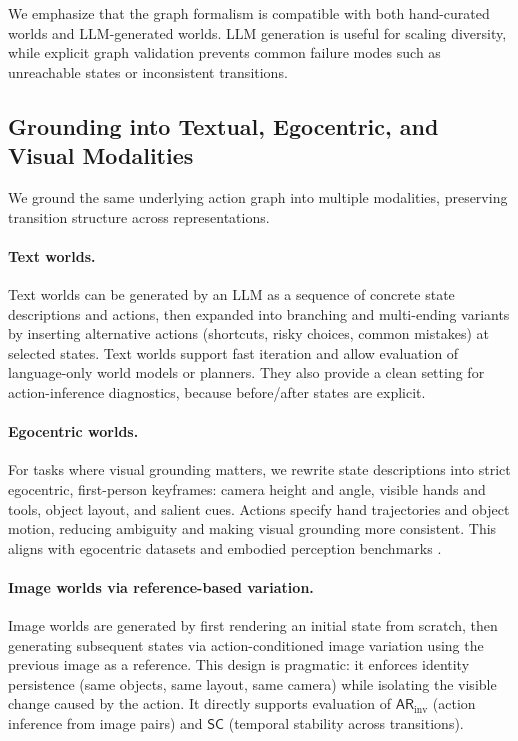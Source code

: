 \documentclass{article}
\theoremstyle{plain}
\theoremstyle{definition}
\theoremstyle{remark}
\begin{document}
We emphasize that the graph formalism is compatible with both hand-curated worlds and LLM-generated worlds. LLM generation is useful for scaling diversity, while explicit graph validation prevents common failure modes such as unreachable states or inconsistent transitions.

\subsection{Grounding into Textual, Egocentric, and Visual Modalities}
We ground the same underlying action graph into multiple modalities, preserving transition structure across representations.

\paragraph{Text worlds.}
Text worlds can be generated by an LLM as a sequence of concrete state descriptions and actions, then expanded into branching and multi-ending variants by inserting alternative actions (shortcuts, risky choices, common mistakes) at selected states. Text worlds support fast iteration and allow evaluation of language-only world models or planners. They also provide a clean setting for action-inference diagnostics, because before/after states are explicit.

\paragraph{Egocentric worlds.}
For tasks where visual grounding matters, we rewrite state descriptions into strict egocentric, first-person keyframes: camera height and angle, visible hands and tools, object layout, and salient cues. Actions specify hand trajectories and object motion, reducing ambiguity and making visual grounding more consistent. This aligns with egocentric datasets and embodied perception benchmarks \cite{grauman2022ego4d,goyal2017something}.

\paragraph{Image worlds via reference-based variation.}
Image worlds are generated by first rendering an initial state from scratch, then generating subsequent states via action-conditioned image variation using the previous image as a reference. This design is pragmatic: it enforces identity persistence (same objects, same layout, same camera) while isolating the visible change caused by the action. It directly supports evaluation of $\mathsf{AR}_{\text{inv}}$ (action inference from image pairs) and $\mathsf{SC}$ (temporal stability across transitions).
\end{document}
